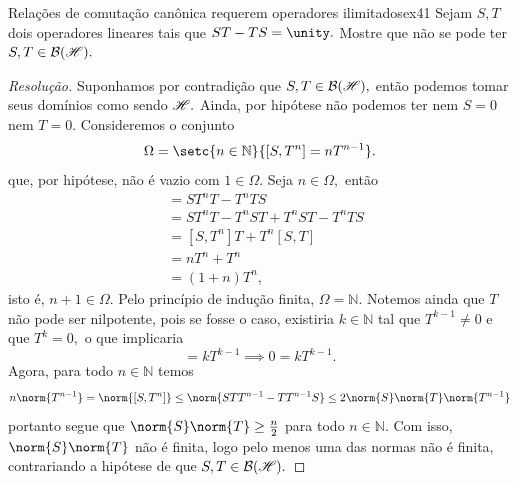 \begin{exercício}{Relações de comutação canônica requerem operadores ilimitados}{ex41}
  Sejam \(S, T\) dois operadores lineares tais que \(ST - TS = \unity.\) Mostre que não se pode ter \(S, T \in \mathcal{B}(\mathscr{H}).\)
\end{exercício}
\begin{proof}[Resolução]
  Suponhamos por contradição que \(S, T \in \mathcal{B}(\mathscr{H}),\) então podemos tomar seus domínios como sendo \(\mathscr{H}.\) Ainda, por hipótese não podemos ter nem \(S = 0\) nem \(T = 0.\) Consideremos o conjunto
  \begin{equation*}
    \Omega = \setc{n \in \mathbb{N}}{[S,T^n] = n T^{n-1}}.
  \end{equation*}
  que, por hipótese, não é vazio com \(1 \in \Omega.\) Seja \(n \in \Omega,\) então
  \begin{align*}
    [S, T^{n+1}] &= ST^nT - T^nTS\\
                 &= ST^nT - T^nST + T^nST - T^nTS\\
                 &= [S,T^n]T + T^n[S,T]\\
                 &= nT^n + T^n\\
                 &= (1 + n)T^n,
  \end{align*}
  isto é, \(n + 1 \in \Omega.\) Pelo princípio de indução finita, \(\Omega = \mathbb{N}.\) Notemos ainda que \(T\) não pode ser nilpotente, pois se fosse o caso, existiria \(k \in \mathbb{N}\) tal que \(T^{k-1} \neq 0\) e que \(T^k = 0,\) o que implicaria
  \begin{equation*}
    [S, T^k] = k T^{k-1} \implies 0 = k T^{k - 1}.
  \end{equation*}
  Agora, para todo \(n \in \mathbb{N}\) temos
  \begin{equation*}
    n \norm{T^{n-1}} = \norm{[S,T^n]} \leq \norm{ST T^{n-1} - TT^{n-1}S} \leq 2\norm{S}\norm{T} \norm{T^{n-1}}
  \end{equation*}
  portanto segue que \(\norm{S}\norm{T} \geq \frac{n}{2}\) para todo \(n \in \mathbb{N}.\) Com isso, \(\norm{S} \norm{T}\) não é finita, logo pelo menos uma das normas não é finita, contrariando a hipótese de que \(S, T \in \mathcal{B}(\mathscr{H}).\)
\end{proof}
